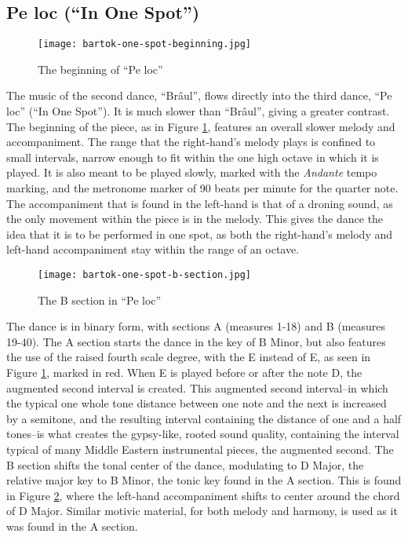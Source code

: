 \subsection{Pe loc (``In One Spot'')}

\begin{figure}
  \centering
  \texttt{[image: bartok-one-spot-beginning.jpg]}
  \caption[The beginning of ``Pe loc'', in Bartok's \textit{Six Romanian Folk Dances}, Sz. 56, BB 68]{The beginning of ``Pe loc''}  
  \label{fig:bartok-one-spot-beginning}
\end{figure}

The music of the second dance, ``Brâul'', flows directly into the third dance, ``Pe loc'' (``In One Spot''). It is much slower than ``Brâul'', giving a greater contrast. The beginning of the piece, as in Figure \ref{fig:bartok-one-spot-beginning}\autocite{Lung_2016}, features an overall slower melody and accompaniment. The range that the right-hand's melody plays is confined to small intervals, narrow enough to fit within the one high octave in which it is played. It is also meant to be played slowly, marked with the \textit{Andante} tempo marking, and the metronome marker of 90 beats per minute for the quarter note. The accompaniment that is found in the left-hand is that of a droning sound, as the only movement within the piece is in the melody. This gives the dance the idea that it is to be performed in one spot, as both the right-hand's melody and left-hand accompaniment stay within the range of an octave.

\begin{figure}
  \centering
  \texttt{[image: bartok-one-spot-b-section.jpg]}
  \caption[The B section of ``Pe loc'', of Bartok's \textit{Romanian Folk Dances, Sz. 56, BB 68}]{The B section in ``Pe loc''}
  \label{fig:bartok-one-spot-b-section}
\end{figure}

The dance is in binary form, with sections A (measures 1-18) and B (measures 19-40). The A section starts the dance in the key of B Minor, but also features the use of the raised fourth scale degree, with the E\musSharp{} instead of E, as seen in Figure \ref{fig:bartok-one-spot-beginning}\autocite{Lung_2016}, marked in red. When E\musSharp{} is played before or after the note D, the augmented second interval is created. This augmented second interval--in which the typical one whole tone distance between one note and the next is increased by a semitone, and the resulting interval containing the distance of one and a half tones--is what creates the gypsy-like, rooted sound quality, containing the interval typical of many Middle Eastern instrumental pieces, the augmented second. The B section shifts the tonal center of the dance, modulating to D Major, the relative major key to B Minor, the tonic key found in the A section. This is found in Figure \ref{fig:bartok-one-spot-b-section}\autocite{Lung_2016}, where the left-hand accompaniment shifts to center around the chord of D Major. Similar motivic material, for both melody and harmony, is used as it was found in the A section.

